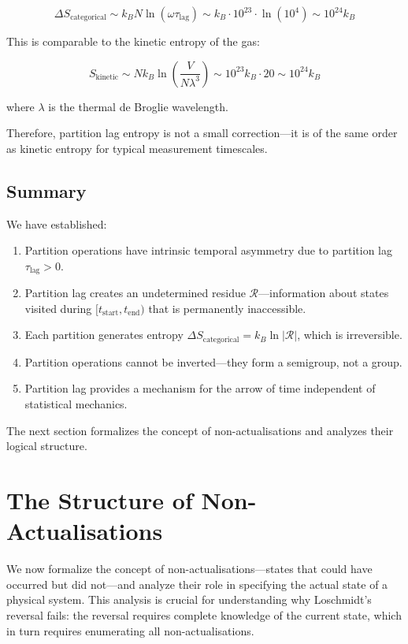 \documentclass[twocolumn,10pt]{article}
\theoremstyle{definition}
\theoremstyle{remark}
\begin{document}
$$
\Delta S_{\text{categorical}} \sim k_B N \ln(\omega \tau_{\text{lag}}) \sim k_B \cdot 10^{23} \cdot \ln(10^4) \sim 10^{24} k_B
$$

This is comparable to the kinetic entropy of the gas:

$$
S_{\text{kinetic}} \sim N k_B \ln\left(\frac{V}{N\lambda^3}\right) \sim 10^{23} k_B \cdot 20 \sim 10^{24} k_B
$$

where $\lambda$ is the thermal de Broglie wavelength.

Therefore, partition lag entropy is not a small correction—it is of the same order as kinetic entropy for typical measurement timescales.

\subsection{Summary}

We have established:

\begin{enumerate}
\item Partition operations have intrinsic temporal asymmetry due to partition lag $\tau_{\text{lag}} > 0$.

\item Partition lag creates an undetermined residue $\mathcal{R}$—information about states visited during $[t_{\text{start}}, t_{\text{end}})$ that is permanently inaccessible.

\item Each partition generates entropy $\Delta S_{\text{categorical}} = k_B \ln |\mathcal{R}|$, which is irreversible.

\item Partition operations cannot be inverted—they form a semigroup, not a group.

\item Partition lag provides a mechanism for the arrow of time independent of statistical mechanics.
\end{enumerate}

The next section formalizes the concept of non-actualisations and analyzes their logical structure.

\section{The Structure of Non-Actualisations}
\label{sec:non_act_structure}

We now formalize the concept of non-actualisations—states that could have occurred but did not—and analyze their role in specifying the actual state of a physical system. This analysis is crucial for understanding why Loschmidt's reversal fails: the reversal requires complete knowledge of the current state, which in turn requires enumerating all non-actualisations.
\end{document}

